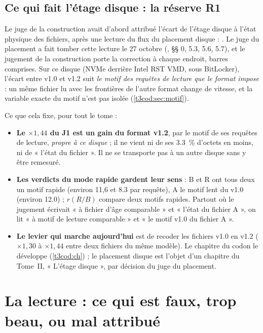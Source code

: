 \subsection{Ce qui fait l'étage disque : la réserve R1}\label{t3jug:sec:r1}

Le juge de la construction avait d'abord attribué l'écart de l'étage disque à l'état physique des fichiers, après une lecture du flux du placement disque : . Le juge du placement a fait tomber cette lecture le 27 octobre (, §§ 0, 5.3, 5.6, 5.7), et le jugement de la construction porte la correction à chaque endroit, barres comprises. Sur ce disque (NVMe derrière Intel RST VMD, sous BitLocker), l'écart entre v1.0 et v1.2 suit \emph{le motif des requêtes de lecture que le format impose} : un même fichier lu avec les frontières de l'autre format change de vitesse, et la variable exacte du motif n'est pas isolée (\cref{t3cod:sec:motif}).

Ce que cela fixe, pour tout le tome :
\begin{itemize}
\item \textbf{Le $\times 1{,}44$ du J1 est un gain du format v1.2}, par le motif de ses requêtes de lecture, \emph{propre à ce disque} ; il ne vient ni de ses \SI{3.3}{\percent} d'octets en moins, ni de « l'état du fichier ». Il ne se transporte pas à un autre disque sans y être remesuré.
\item \textbf{Les verdicts du mode rapide gardent leur sens} : B et R ont tous deux un motif rapide (environ 11,6 et \SI{8.3}{\Mo} par requête), A le motif lent du v1.0 (environ \SI{12.0}{\Mo}) ; $r(R/B)$ compare deux motifs rapides. Partout où le jugement écrivait « à fichier d'âge comparable » et « l'état du fichier A », on lit « à motif de lecture comparable » et « le motif v1.0 du fichier A ».
\item \textbf{Le levier qui marche aujourd'hui} est de recoder les fichiers v1.0 en v1.2 ($\times 1{,}30$ à $\times 1{,}44$ entre deux fichiers du même modèle). Le chapitre du codon le développe (\cref{t3cod:ch}) ; le placement disque est l'objet d'un chapitre du Tome~II, « L'étage disque », par décision du juge du placement.
\end{itemize}

\section{La lecture : ce qui est faux, trop beau, ou mal attribué}\label{t3jug:sec:lecture}

